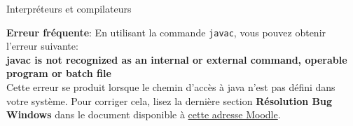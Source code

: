 \begin{section}{Interpréteurs et compilateurs}
\begin{Exercice}[10 minutes]
\begin{solution}
            \textbf{Erreur fréquente}: En utilisant la commande \lstinline{javac}, vous pouvez obtenir l'erreur suivante:\\
            \textbf{javac is not recognized as an internal or external command, operable program or batch file}\\
            Cette erreur se produit lorsque le chemin d'accès à java n'est pas défini dans votre système. Pour corriger cela, lisez la dernière section \textbf{Résolution Bug Windows} dans le document disponible à \href{https://moodle.unil.ch/pluginfile.php/3691183/mod_resource/content/8/prerequisite_win.pdf}{cette adresse Moodle}.

        \end{solution}

    \end{Exercice}
    
\end{section}
